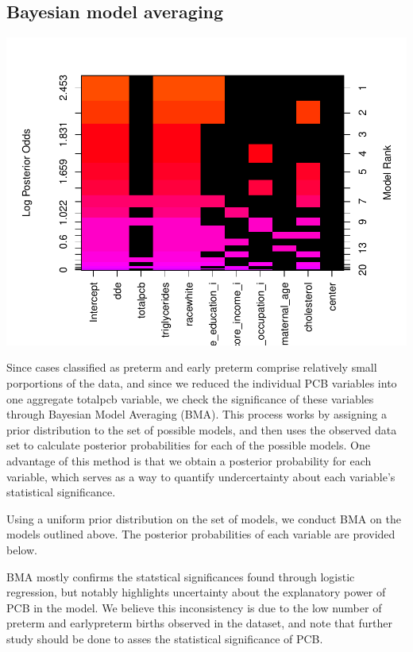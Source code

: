 \documentclass[10pt,]{article}
\begin{document}
\hypertarget{bayesian-model-averaging}{%
\subsection{Bayesian model averaging}\label{bayesian-model-averaging}}

\includegraphics{report_files/figure-latex/unnamed-chunk-8-1.pdf}

Since cases classified as preterm and early preterm comprise relatively
small porportions of the data, and since we reduced the individual PCB
variables into one aggregate totalpcb variable, we check the
significance of these variables through Bayesian Model Averaging (BMA).
This process works by assigning a prior distribution to the set of
possible models, and then uses the observed data set to calculate
posterior probabilities for each of the possible models. One advantage
of this method is that we obtain a posterior probability for each
variable, which serves as a way to quantify undercertainty about each
variable's statistical significance.

Using a uniform prior distribution on the set of models, we conduct BMA
on the models outlined above. The posterior probabilities of each
variable are provided below.

BMA mostly confirms the statstical significances found through logistic
regression, but notably highlights uncertainty about the explanatory
power of PCB in the model. We believe this inconsistency is due to the
low number of preterm and earlypreterm births observed in the dataset,
and note that further study should be done to asses the statistical
significance of PCB.
\end{document}
